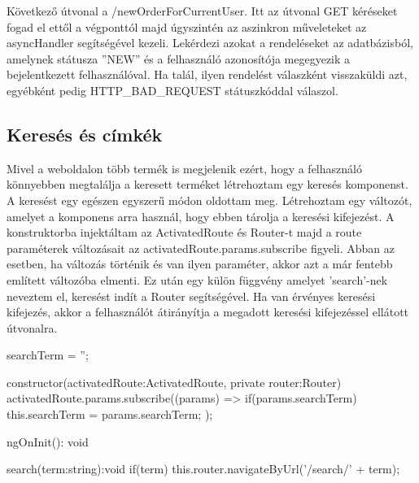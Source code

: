Következő útvonal a /newOrderForCurrentUser. Itt az útvonal GET kéréseket fogad el ettől a végponttól majd úgyszintén az aszinkron műveleteket az asyncHandler segítségével kezeli. Lekérdezi azokat a rendeléseket az adatbázisból, amelynek státusza ”NEW” és a felhasználó azonosítója megegyezik a bejelentkezett felhasználóval. Ha talál, ilyen rendelést válaszként visszaküldi azt, egyébként pedig HTTP\_BAD\_REQUEST státuszkóddal válaszol.

\subsection{Keresés és címkék}
Mivel a weboldalon több termék is megjelenik ezért, hogy a felhasználó könnyebben megtalálja a keresett terméket létrehoztam egy keresés komponenst. A keresést egy egészen egyszerű módon oldottam meg. Létrehoztam egy változót, amelyet a komponens arra használ, hogy ebben tárolja a keresési kifejezést. A konstruktorba injektáltam az ActivatedRoute és Router-t majd a route paraméterek változásait az activatedRoute.params.subscribe figyeli. Abban az esetben, ha változás történik és van ilyen paraméter, akkor azt a már fentebb említett változóba elmenti. Ez után egy külön függvény amelyet ’search’-nek neveztem el, keresést indít a Router segítségével. Ha van érvényes keresési kifejezés, akkor a felhasználót átirányítja a megadott keresési kifejezéssel ellátott útvonalra. 

\begin{python}[caption={Keresés},captionpos=b]
  searchTerm = '';

  constructor(activatedRoute:ActivatedRoute, private router:Router) {
    activatedRoute.params.subscribe((params) => {
      if(params.searchTerm) this.searchTerm = params.searchTerm;
    });
  }

  ngOnInit(): void {
  }

  search(term:string):void{
    if(term)
    this.router.navigateByUrl('/search/' + term);
  }
\end{python}

